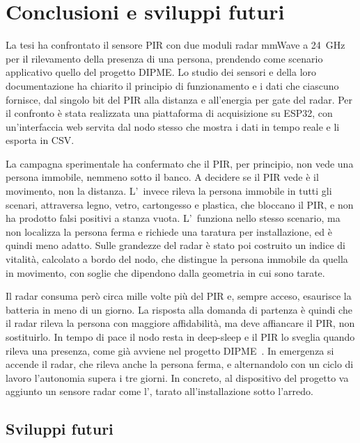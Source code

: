 \chapter{Conclusioni e sviluppi futuri}
\label{chap:conclusioni}

La tesi ha confrontato il sensore PIR con due moduli radar mmWave a 24~GHz per il rilevamento della presenza di una persona, prendendo come scenario applicativo quello del progetto DIPME. Lo studio dei sensori e della loro documentazione ha chiarito il principio di funzionamento e i dati che ciascuno fornisce, dal singolo bit del PIR alla distanza e all'energia per gate del radar. Per il confronto è stata realizzata una piattaforma di acquisizione su ESP32, con un'interfaccia web servita dal nodo stesso che mostra i dati in tempo reale e li esporta in CSV.

La campagna sperimentale ha confermato che il PIR, per principio, non vede una persona immobile, nemmeno sotto il banco. A decidere se il PIR vede è il movimento, non la distanza. L'\ldb\ invece rileva la persona immobile in tutti gli scenari, attraversa legno, vetro, cartongesso e plastica, che bloccano il PIR, e non ha prodotto falsi positivi a stanza vuota. L'\ldc\ funziona nello stesso scenario, ma non localizza la persona ferma e richiede una taratura per installazione, ed è quindi meno adatto. Sulle grandezze del radar è stato poi costruito un indice di vitalità, calcolato a bordo del nodo, che distingue la persona immobile da quella in movimento, con soglie che dipendono dalla geometria in cui sono tarate.

Il radar consuma però circa mille volte più del PIR e, sempre acceso, esaurisce la batteria in meno di un giorno. La risposta alla domanda di partenza è quindi che il radar rileva la persona con maggiore affidabilità, ma deve affiancare il PIR, non sostituirlo. In tempo di pace il nodo resta in deep-sleep e il PIR lo sveglia quando rileva una presenza, come già avviene nel progetto DIPME~\cite{callisto2026dipme}. In emergenza si accende il radar, che rileva anche la persona ferma, e alternandolo con un ciclo di lavoro l'autonomia supera i tre giorni. In concreto, al dispositivo del progetto va aggiunto un sensore radar come l'\ldb, tarato all'installazione sotto l'arredo.

\section{Sviluppi futuri}
\label{sec:conclusioni-sviluppi}

